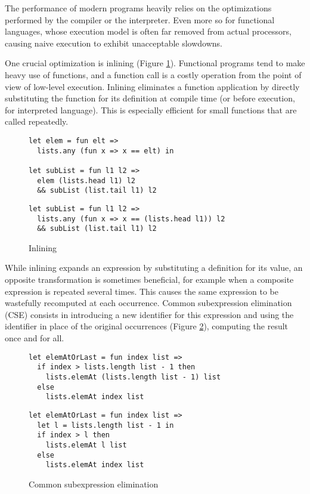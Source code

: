 \documentclass[sigplan,10pt,review,anonymous]{acmart}
\newcommand{\info}[2][1=]{}
\begin{document}
The performance of modern programs heavily relies on the optimizations performed
by the compiler or the interpreter. Even more so for functional languages, whose
execution model is often far removed from actual processors, causing naive
execution to exhibit unacceptable slowdowns.

One crucial optimization is
inlining (Figure \ref{fig:optimizations-inlining-ex}). Functional programs tend
to make heavy use of functions, and a function call is a costly operation from
the point of view of low-level execution. Inlining eliminates a function
application by directly substituting the function for its definition at compile
time (or before execution, for interpreted language). This is especially
efficient for small functions that are called repeatedly.

\info{I think it's better to use [h] on figures, we can discuss it}
\begin{figure}[h]
  \begin{center}
\begin{lstlisting}[language=nickel,title={Source program}]
let elem = fun elt =>
  lists.any (fun x => x == elt) in

let subList = fun l1 l2 =>
  elem (lists.head l1) l2
  && subList (list.tail l1) l2
\end{lstlisting}
\begin{lstlisting}[language=nickel,title={Optimized program}]
let subList = fun l1 l2 =>
  lists.any (fun x => x == (lists.head l1)) l2
  && subList (list.tail l1) l2
\end{lstlisting}
  \end{center}
\caption{Inlining}
\label{fig:optimizations-inlining-ex}
\end{figure}

While inlining expands an expression by substituting a definition for its value,
an opposite transformation is sometimes beneficial, for example when a composite
expression is repeated several times. This causes the same expression to be
wastefully recomputed at each occurrence. Common subexpression elimination (CSE)
consists in introducing a new identifier for this expression and using the
identifier in place of the original occurrences
(Figure \ref{fig:optimizations-cse-ex}), computing the result once and for all.

\begin{figure}[h]
  \begin{center}
\begin{lstlisting}[language=nickel,title={Source program}]
let elemAtOrLast = fun index list =>
  if index > lists.length list - 1 then
    lists.elemAt (lists.length list - 1) list
  else
    lists.elemAt index list
\end{lstlisting}
\begin{lstlisting}[language=nickel,title={Optimized program}]
let elemAtOrLast = fun index list =>
  let l = lists.length list - 1 in
  if index > l then
    lists.elemAt l list
  else
    lists.elemAt index list
\end{lstlisting}
  \end{center}
\caption{Common subexpression elimination}
\label{fig:optimizations-cse-ex}
\end{figure}
\end{document}
